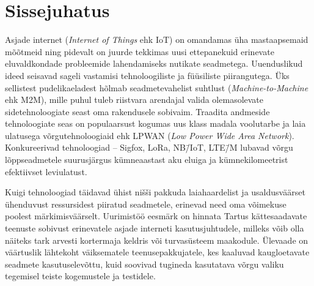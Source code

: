 \documentclass[12pt]{article}
\newcommand{\TODO}{\todo[inline]}
\begin{document}
    {\EngInfo}{\EstInfo}


    \newpage
    \setlength{\parskip}{0em}
    \tableofcontents
    \setlength{\parskip}{1em}



    \newpage


    \section*{Sissejuhatus}


    Asjade internet (\textit{Internet of Things} ehk IoT) on omandamas üha mastaapsemaid mõõtmeid ning pidevalt on juurde tekkimas uusi ettepanekuid erinevate eluvaldkondade probleemide lahendamiseks nutikate seadmetega.
    Uuenduslikud ideed seisavad sageli vastamisi tehnoloogiliste ja füüsiliste piirangutega.
    Üks sellistest pudelikaeladest hõlmab seadmetevahelist suhtlust (\textit{Machine-to-Machine} ehk M2M), mille puhul tuleb riistvara arendajal valida olemasolevate sidetehnoloogiate seast oma rakendusele sobivaim.
    Traadita andmeside tehnoloogiate seas on populaarsust kogumas uus klass madala voolutarbe ja laia ulatusega võrgutehnoloogiaid ehk LPWAN (\textit{Low Power Wide Area Network}).
    Konkureerivad tehnoloogiad -- Sigfox, LoRa, NB\=/IoT, LTE\=/M lubavad võrgu lõppseadmetele suurusjärgus kümneaastast aku eluiga ja kümnekilomeetrist efektiivset leviulatust.

    Kuigi tehnoloogiad täidavad ühist nišši pakkuda laiahaardelist ja usaldusväärset ühenduvust ressursidest piiratud seadmetele, erinevad need oma võimekuse poolest märkimisväärselt.
    Uurimistöö eesmärk on hinnata Tartus kättesaadavate teenuste sobivust erinevatele asjade interneti kasutusjuhtudele, milleks võib olla näiteks tark arvesti kortermaja keldris või turvasüsteem maakodule.
    Ülevaade on väärtuslik lähtekoht väiksematele teenusepakkujatele, kes kaaluvad kaugloetavate seadmete kasutuselevõttu, kuid soovivad tugineda kasutatava võrgu valiku tegemisel teiste kogemustele ja testidele.
\end{document}
